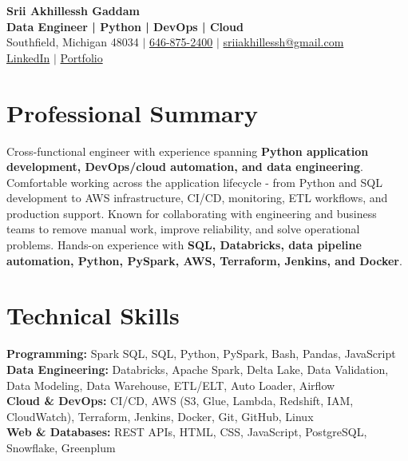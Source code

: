 \documentclass[letterpaper,10pt]{article}
\begin{document}
\fontsize{9.35pt}{10.45pt}\selectfont

\begin{center}
    {\LARGE \textbf{Srii Akhillessh Gaddam}} \\[-1pt]
    \textbf{Data Engineer | Python | DevOps | Cloud} \\[2pt]
    Southfield, Michigan 48034 $|$
    \href{tel:6468752400}{646-875-2400} $|$
    \href{mailto:sriiakhillessh@gmail.com}{sriiakhillessh@gmail.com} \\[1pt]
    \href{https://www.linkedin.com/in/srii-akhiilessh-gaddam-b48668191/}{LinkedIn} $|$
    \href{https://sriiakhillesshg.github.io/portfolio/}{Portfolio}
\end{center}
\vspace{-8pt}

\section{Professional Summary}
\small{Cross-functional engineer with experience spanning \textbf{Python application development, DevOps/cloud automation, and data engineering}. Comfortable working across the application lifecycle - from Python and SQL development to AWS infrastructure, CI/CD, monitoring, ETL workflows, and production support. Known for collaborating with engineering and business teams to remove manual work, improve reliability, and solve operational problems. Hands-on experience with \textbf{SQL, Databricks, data pipeline automation, Python, PySpark, AWS, Terraform, Jenkins, and Docker}.}

\section{Technical Skills}
\small{
\textbf{Programming:} Spark SQL, SQL, Python, PySpark, Bash, Pandas, JavaScript \\
\textbf{Data Engineering:} Databricks, Apache Spark, Delta Lake, Data Validation, Data Modeling, Data Warehouse, ETL/ELT, Auto Loader, Airflow \\
\textbf{Cloud \& DevOps:} CI/CD, AWS (S3, Glue, Lambda, Redshift, IAM, CloudWatch), Terraform, Jenkins, Docker, Git, GitHub, Linux \\
\textbf{Web \& Databases:} REST APIs, HTML, CSS, JavaScript, PostgreSQL, Snowflake, Greenplum
}
\end{document}
